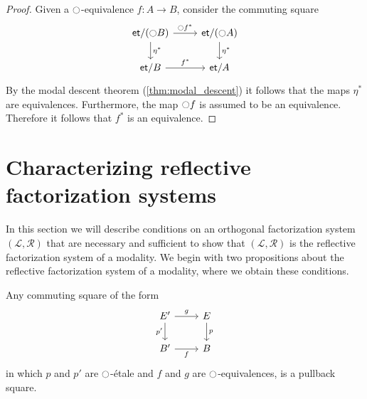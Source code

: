 \documentclass[9pt,twosided]{amsart}
\newcommand{\et}{\mathsf{et}}
\begin{document}
\begin{proof}
  Given a ${\ocircle}$-equivalence $f:A\to B$, consider the commuting square
  \begin{equation*}
    \begin{tikzcd}
      \et/(\modal B) \arrow[r,"\modal f^\ast"] \arrow[d,"\eta^\ast"] & \et/(\modal A) \arrow[d,"\eta^\ast"] \\
      \et/B \arrow[r,"f^\ast"] & \et/A
    \end{tikzcd}
  \end{equation*}
  By the modal descent theorem (\cref{thm:modal_descent}) it follows that the maps $\eta^\ast$ are equivalences. Furthermore, the map ${\ocircle} f$ is assumed to be an equivalence. Therefore it follows that $f^\ast$ is an equivalence.
\end{proof}

\section{Characterizing reflective factorization systems}

In this section we will describe conditions on an orthogonal factorization system $(\mathcal{L},\mathcal{R})$ that are necessary and sufficient to show that $(\mathcal{L},\mathcal{R})$ is the reflective factorization system of a modality. We begin with two propositions about the reflective factorization system of a modality, where we obtain these conditions.

\begin{prp}\label{prop:LR-cartesian}
  Any commuting square of the form
  \begin{equation*}
    \begin{tikzcd}
      E' \arrow[d,swap,"{p'}"] \arrow[r,"g"] & E \arrow[d,"p"] \\
      B' \arrow[r,swap,"f"] & B
    \end{tikzcd}
  \end{equation*}
  in which $p$ and $p'$ are ${\ocircle}$-\'etale and $f$ and $g$ are ${\ocircle}$-equivalences, is a pullback square.
\end{prp}
\end{document}
